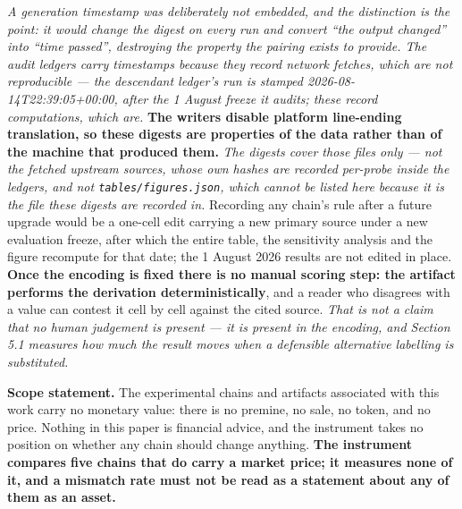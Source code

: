 \documentclass[
]{article}
\newcounter{none} %
\begin{document}
\emph{A generation timestamp was deliberately not embedded, and the
distinction is the point: it would change the digest on every run and
convert ``the output changed'' into ``time passed'', destroying the
property the pairing exists to provide. The audit ledgers carry
timestamps because they record network fetches, which are not
reproducible --- the descendant ledger's run is stamped
2026-08-14T22:39:05+00:00, after the 1 August freeze it audits; these
record computations, which are.} \textbf{The writers disable platform
line-ending translation, so these digests are properties of the data
rather than of the machine that produced them.} \emph{The digests cover
those files only --- not the fetched upstream sources, whose own hashes
are recorded per-probe inside the ledgers, and not
\texttt{tables/figures.json}, which cannot be listed here because it is
the file these digests are recorded in.} Recording any chain's rule
after a future upgrade would be a one-cell edit carrying a new primary
source under a new evaluation freeze, after which the entire table, the
sensitivity analysis and the figure recompute for that date; the 1
August 2026 results are not edited in place. \textbf{Once the encoding
is fixed there is no manual scoring step: the artifact performs the
derivation deterministically}, and a reader who disagrees with a value
can contest it cell by cell against the cited source. \emph{That is not
a claim that no human judgement is present --- it is present in the
encoding, and Section 5.1 measures how much the result moves when a
defensible alternative labelling is substituted.}

\textbf{Scope statement.} The experimental chains and artifacts
associated with this work carry no monetary value: there is no premine,
no sale, no token, and no price. Nothing in this paper is financial
advice, and the instrument takes no position on whether any chain should
change anything. \textbf{The instrument compares five chains that do
carry a market price; it measures none of it, and a mismatch rate must
not be read as a statement about any of them as an asset.}



\end{document}
